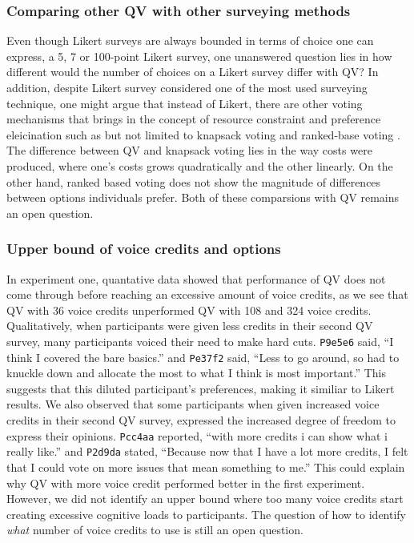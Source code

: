 \subsubsection{Comparing other QV with other surveying methods}
Even though Likert surveys are always bounded in terms of choice one can express, a 5, 7 or 100-point Likert survey, one unanswered question lies in how different would the number of choices on a Likert survey differ with QV? In addition, despite Likert survey considered one of the most used surveying technique, one might argue that instead of Likert, there are other voting mechanisms that brings in the concept of resource constraint and preference eleicination such as but not limited to knapsack voting \cite{goel2015knapsack} and ranked-base voting \cite{ledo2018evaluation}. The difference between QV and knapsack voting lies in the way costs were produced, where one's costs grows quadratically and the other linearly. On the other hand, ranked based voting does not show the magnitude of differences between options individuals prefer. Both of these comparsions with QV remains an open question.

\subsubsection{Upper bound of voice credits and options}
In experiment one, quantative data showed that performance of QV does not come through before reaching an excessive amount of voice credits, as we see that QV with 36 voice credits unperformed QV with 108 and 324 voice credits. Qualitatively, when participants were given less credits in their second QV survey, many participants voiced their need to make hard cuts. \texttt{P9e5e6} said, ``I think I covered the bare basics.'' and \texttt{Pe37f2} said, ``Less to go around, so had to knuckle down and allocate the most to what I think is most important.'' This suggests that this diluted participant's preferences, making it similiar to Likert results. We also observed that some participants when given increased voice credits in their second QV survey, expressed the increased degree of freedom to express their opinions. \texttt{Pcc4aa} reported, ``with more credits i can show what i really like.'' and \texttt{P2d9da} stated, ``Because now that I have a lot more credits, I felt that I could vote on more issues that mean something to me.'' This could explain why QV with more voice credit performed better in the first experiment. However, we did not identify an upper bound where too many voice credits start creating excessive cognitive loads to participants. The question of how to identify \textit{what} number of voice credits to use is still an open question.

